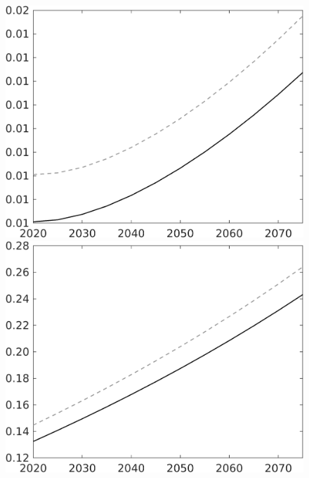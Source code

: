 \begin{figure}[h!!]
\begin{minipage}[]{0.32\textwidth}
\end{minipage}		
\begin{minipage}[]{0.32\textwidth}
\includegraphics[width=1\textwidth]{../../codding_model/own_basedOnFried/optimalPol_010922_revision/figures/all_13Sept22/CompTaul_LFBAU_Reg0_wsg_spillover0_nsk1_xgr0_sep1_countec0_GovRev1_etaa0.79_lgd0.png}
\end{minipage}		
\begin{minipage}[]{0.32\textwidth}
\includegraphics[width=1\textwidth]{../../codding_model/own_basedOnFried/optimalPol_010922_revision/figures/all_13Sept22/CompTaul_LFBAU_Reg0_wsn_spillover0_nsk1_xgr0_sep1_countec0_GovRev1_etaa0.79_lgd0.png}
\end{minipage}	
\end{figure}


